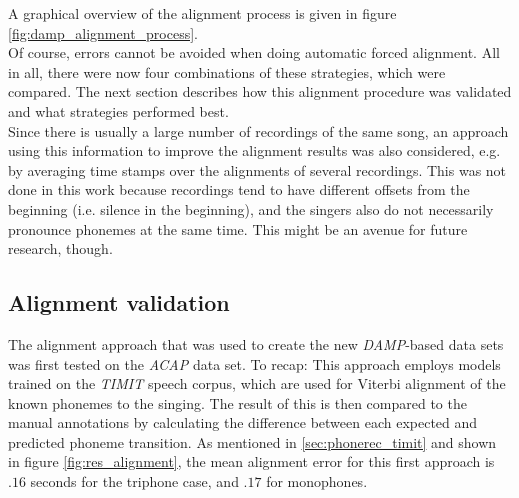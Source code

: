 A graphical overview of the alignment process is given in figure \ref{fig:damp_alignment_process}.\\
Of course, errors cannot be avoided when doing automatic forced alignment. All in all, there were now four combinations of these strategies, which were compared. The next section describes how this alignment procedure was validated and what strategies performed best.\\
Since there is usually a large number of recordings of the same song, an approach using this information to improve the alignment results was also considered, e.g. by averaging time stamps over the alignments of several recordings. This was not done in this work because recordings tend to have different offsets from the beginning (i.e. silence in the beginning), and the singers also do not necessarily pronounce phonemes at the same time. This might be an avenue for future research, though.


\subsection{Alignment validation}
The alignment approach that was used to create the new \textit{DAMP}-based data sets was first tested on the \textit{ACAP} data set. To recap: This approach employs models trained on the \textit{TIMIT} speech corpus, which are used for Viterbi alignment of the known phonemes to the singing. The result of this is then compared to the manual annotations by calculating the difference between each expected and predicted phoneme transition. As mentioned in \ref{sec:phonerec_timit} and shown in figure \ref{fig:res_alignment}, the mean alignment error for this first approach is $.16$ seconds for the triphone case, and $.17$ for monophones.\\

